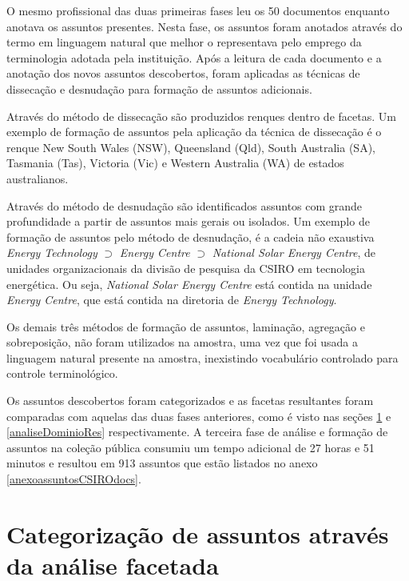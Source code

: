 O mesmo profissional das duas primeiras fases leu os 50 documentos enquanto anotava os assuntos presentes. Nesta fase, os assuntos foram anotados através do termo em linguagem natural que melhor o representava pelo emprego da terminologia adotada pela instituição. Após a leitura de cada documento e a anotação dos novos assuntos descobertos, foram aplicadas as técnicas de dissecação e desnudação para formação de assuntos adicionais. 

Através do método de dissecação são produzidos renques dentro de facetas. Um exemplo de formação de assuntos pela aplicação da técnica de dissecação é o renque New South Wales (NSW), Queensland (Qld), South Australia (SA), Tasmania (Tas), Victoria (Vic) e Western Australia (WA) de estados australianos.

Através do método de desnudação são identificados assuntos com grande profundidade a partir de assuntos mais gerais ou isolados.%
Um exemplo de formação de assuntos pelo método de desnudação, é a cadeia não exaustiva \textit{Energy Technology} $\supset$ \textit{Energy Centre} $\supset$ \textit{National Solar Energy Centre}, de unidades organizacionais da divisão de pesquisa da CSIRO em tecnologia energética.
Ou seja, \textit{National Solar Energy Centre} está contida na unidade \textit{Energy Centre}, que está contida na diretoria de \textit{Energy Technology}.

Os demais três métodos de formação de assuntos, laminação, agregação e sobreposição, não foram utilizados na amostra, uma vez que foi usada a linguagem natural presente na amostra, inexistindo vocabulário controlado para controle terminológico.

Os assuntos descobertos foram categorizados e as facetas resultantes foram comparadas com aquelas das duas fases anteriores, como é visto nas seções \ref{categorizacao} e \ref{analiseDominioRes} respectivamente. A terceira fase de análise e formação de assuntos na coleção pública consumiu um tempo adicional de 27 horas e 51 minutos e resultou em 913 assuntos que estão listados no anexo \ref{anexoassuntosCSIROdocs}.



\section{Categorização de assuntos através da análise facetada}
\label{categorizacao}

